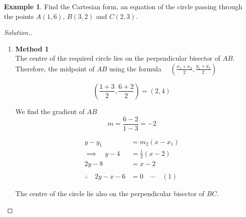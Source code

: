 \documentclass[11pt,a4paper]{article}
\theoremstyle{definition}
\newtheorem{example}[thm]{Example}
\newenvironment{solution}
  {\renewcommand{\qedsymbol}{}\begin{proof}[\textit{Solution}.]}
  {\end{proof}}
\begin{document}
\begin{example}

Find the Cartesian form, an equation of the circle passing through the points $A(1,6),\, B(3,2)$ and $C(2,3)$.
\end{example}
\begin{solution}

\begin{enumerate}
\item[]\textbf{Method 1}\\
The centre of the required circle lies on the perpendicular bisector of $AB$.\\

Therefore, the midpoint of $AB$ using the formula $\quad \left(\frac{x_1 + x_2}{2}, \frac{y_1 + y_2}{2}\right)$

$$\left(\frac{1 + 3}{2},\frac{6 + 2}{2}\right) = (2,4)$$

\begin{figure}[H]
\centering
{}
\end{figure}













We find the gradient of $AB$ 
$$m = \frac{6-2}{1-3} = -2$$

\begin{align*}
y - y_1 & = m_2 (x - x_1)\\
\implies\quad  y - 4 & = \frac{1}{2}(x - 2)\\
2y -  8 &  = x - 2\\\\
\therefore\quad  2y - x - 6 & = 0\quad \cdots\quad  (1)
\end{align*}



The centre of the circle lie also on the perpendicular bisector of $BC$.\\


\end{enumerate}
\end{solution}
\end{document}
